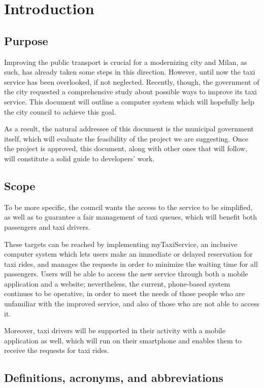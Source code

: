 \chapter{Introduction}


\section{Purpose}
Improving the public transport is crucial for a modernizing city and Milan, as such, has already taken some steps in this direction. However, until now the taxi service has been overlooked, if not neglected. Recently, though, the government of the city requested a comprehensive study about possible ways to improve its taxi service. This document will outline a computer system which will hopefully help the city council to achieve this goal.

As a result, the natural addressee of this document is the municipal government itself, which will evaluate the feasibility of the project we are suggesting. Once the project is approved, this document, along with other ones that will follow, will constitute a solid guide to developers' work.


\section{Scope}
To be more specific, the council wants the access to the service to be simplified, as well as to guarantee a fair management of taxi queues, which will benefit both passengers and taxi drivers. 

These targets can be reached by implementing myTaxiService, an inclusive computer system which lets users make an immediate or delayed reservation for taxi rides, and manages the requests in order to minimize the waiting time for all passengers. Users will be able to access the new service through both a mobile application and a website; nevertheless, the current, phone-based system continues to be operative, in order to meet the needs of those people who are unfamiliar with the improved service, and also of those who are not able to access it. 

Moreover, taxi drivers will be supported in their activity with a mobile application as well, which will run on their smartphone and enables them to receive the requests for taxi rides.


\section{Definitions, acronyms, and abbreviations}	 

